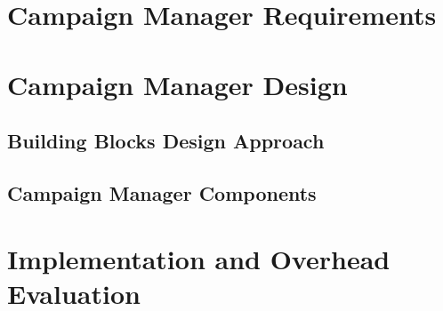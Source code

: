 \label{ch:cmanager}

\section{Campaign Manager Requirements}
\section{Campaign Manager Design}
\subsection{Building Blocks Design Approach}
\subsection{Campaign Manager Components}
\section{Implementation and Overhead Evaluation}
